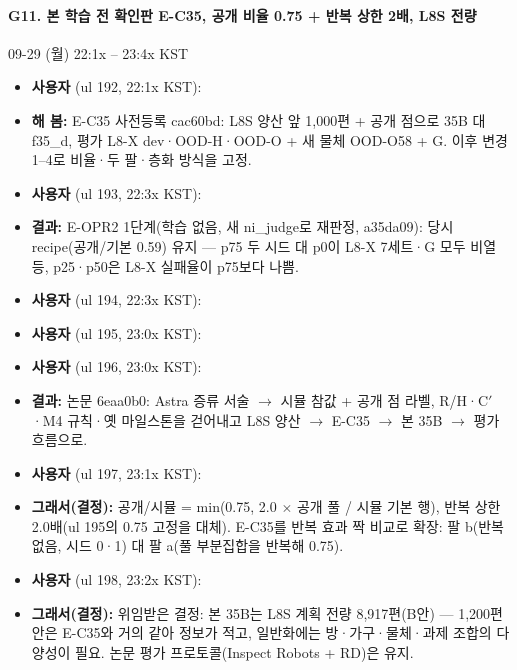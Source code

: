 \paragraph{G11. 본 학습 전 확인판 E-C35, 공개 비율 0.75 + 반복 상한 2배, L8S 전량}
{\small 09-29 (월) 22:1x -- 23:4x KST}
\begin{itemize}
  \item \textbf{사용자} (ul 192, 22:1x KST): 
  \item \textbf{해 봄:} E-C35 사전등록 cac60bd: L8S 양산 앞 1,000편 + 공개 점으로 35B 대 f35\_d, 평가 L8-X dev·OOD-H·OOD-O + 새 물체 OOD-O58 + G. 이후 변경 1--4로 비율·두 팔·층화 방식을 고정.
  \item \textbf{사용자} (ul 193, 22:3x KST): 
  \item \textbf{결과:} E-OPR2 1단계(학습 없음, 새 ni\_judge로 재판정, a35da09): 당시 recipe(공개/기본 0.59) 유지 --- p75 두 시드 대 p0이 L8-X 7세트·G 모두 비열등, p25·p50은 L8-X 실패율이 p75보다 나쁨.
  \item \textbf{사용자} (ul 194, 22:3x KST): 
  \item \textbf{사용자} (ul 195, 23:0x KST): 
  \item \textbf{사용자} (ul 196, 23:0x KST): 
  \item \textbf{결과:} 논문 6eaa0b0: Astra 증류 서술 $\rightarrow$ 시뮬 참값 + 공개 점 라벨, R/H·C$'$·M4 규칙·옛 마일스톤을 걷어내고 L8S 양산 $\rightarrow$ E-C35 $\rightarrow$ 본 35B $\rightarrow$ 평가 흐름으로.
  \item \textbf{사용자} (ul 197, 23:1x KST): 
  \item \textbf{그래서(결정):} 공개/시뮬 = min(0.75, 2.0 $\times$ 공개 풀 / 시뮬 기본 행), 반복 상한 2.0배(ul 195의 0.75 고정을 대체). E-C35를 반복 효과 짝 비교로 확장: 팔 b(반복 없음, 시드 0·1) 대 팔 a(풀 부분집합을 반복해 0.75).
  \item \textbf{사용자} (ul 198, 23:2x KST): 
  \item \textbf{그래서(결정):} 위임받은 결정: 본 35B는 L8S 계획 전량 8,917편(B안) --- 1,200편 안은 E-C35와 거의 같아 정보가 적고, 일반화에는 방·가구·물체·과제 조합의 다양성이 필요. 논문 평가 프로토콜(Inspect Robots + RD)은 유지.
\end{itemize}

